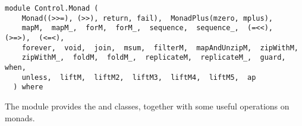 \label{module:Control.Monad}
\haddockbeginheader
{\haddockverb\begin{verbatim}
module Control.Monad (
    Monad((>>=), (>>), return, fail),  MonadPlus(mzero, mplus), 
    mapM,  mapM_,  forM,  forM_,  sequence,  sequence_,  (=<<),  (>=>),  (<=<), 
    forever,  void,  join,  msum,  filterM,  mapAndUnzipM,  zipWithM, 
    zipWithM_,  foldM,  foldM_,  replicateM,  replicateM_,  guard,  when, 
    unless,  liftM,  liftM2,  liftM3,  liftM4,  liftM5,  ap
  ) where\end{verbatim}}
\haddockendheader

The  module provides the  and
  classes, together with some useful operations on monads.
\par

